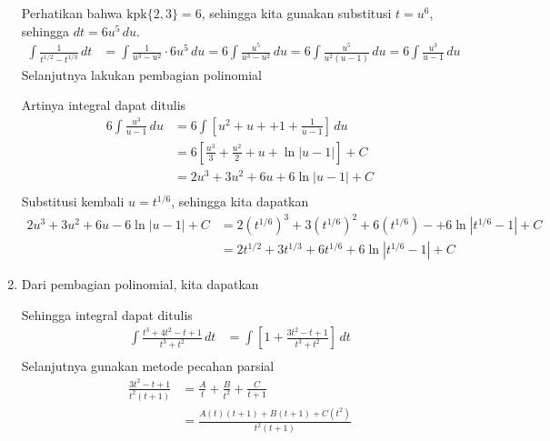 \documentclass[11pt,openany,a4paper]{article}
\begin{document}
\begin{enumerate}
        Perhatikan bahwa $\text{kpk}\{2,3\}=6$, sehingga kita gunakan substitusi $t=u^6$, sehingga $dt = 6u^5 \, du$.
        \begin{align*}
          \int \frac{1}{t^{1/2} - t^{1/3}} \, dt &= \int \frac{1}{u^3 - u^2} \cdot 6u^5 \, du 
          = 6\int \frac{u^5}{u^3 - u^2} \, du = 6\int \frac{u^5}{u^2(u - 1)} \, du
          = 6\int \frac{u^3}{u - 1} \, du 
        \end{align*}
        Selanjutnya lakukan pembagian polinomial
        \begin{center}
        \end{center}
        Artinya integral dapat ditulis
        \begin{align*}
          6\int \frac{u^3}{u - 1} \, du &= 6\int \left[u^2 + u + + 1+\frac{1}{u - 1}\right] \, du \\
          &= 6\left[\frac{u^3}{3} + \frac{u^2}{2} + u + \ln|u - 1|\right] + C \\
          &= 2u^3 + 3u^2 + 6u + 6\ln|u - 1| + C \\
        \end{align*}
        Substitusi kembali $u = t^{1/6}$, sehingga kita dapatkan
        \begin{align*}
          2u^3 + 3u^2 + 6u - 6\ln|u - 1| + C &= 2(t^{1/6})^3 + 3(t^{1/6})^2 + 6(t^{1/6}) -+6\ln|t^{1/6} - 1| + C \\
          &= \boxed{2t^{1/2} + 3t^{1/3} + 6t^{1/6} + 6\ln|t^{1/6} - 1| + C} 
        \end{align*}
        \item Dari pembagian polinomial, kita dapatkan
        \begin{center}
        \end{center}
        Sehingga integral dapat ditulis
        \begin{align*}
          \int \frac{t^3 + 4t^2 - t + 1}{t^3 + t^2} \, dt &= \int \left[1 + \frac{3t^2-t+1}{t^3+t^2}\right] \, dt \\
        \end{align*}
        Selanjutnya gunakan metode pecahan parsial
        \begin{align*}
          \frac{3t^2 - t + 1}{t^2(t + 1)} &= \frac{A}{t} + \frac{B}{t^2} + \frac{C}{t + 1} \\
          &= \frac{A(t)(t + 1) + B(t + 1) + C(t^2)}{t^2(t + 1)} \\

\end{align*}
\end{enumerate}
\end{document}
